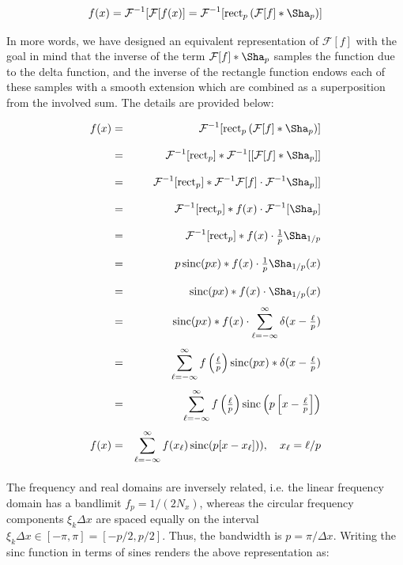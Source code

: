 \documentclass[11pt,titlepage]{report}
\begin{document}
$$f(x) = \mathcal{F}^{-1}[\mathcal{F}[f(x)] = \mathcal{F}^{-1}[\text{rect}_p\,(\mathcal{F}[f] * \Sha_p)]$$

\noindent In more words, we have designed an equivalent representation of $\mathcal{F}[f]$ with the goal in mind that the inverse of the term $\mathcal{F}[f] * \Sha_p$ samples the function due to the delta function, and the inverse of the rectangle function endows each of these samples with a smooth extension which are combined as a superposition from the involved sum. The details are provided below:

\begin{eqnarray*}
  f(x) & = & \mathcal{F}^{-1}[\text{rect}_p\,(\mathcal{F}[f] * \Sha_p)] \\[0.8em]
& = & \mathcal{F}^{-1}[\text{rect}_p] * \mathcal{F}^{-1}[[\mathcal{F}[f]*\Sha_p]] \\[0.8em]
& = & \mathcal{F}^{-1}[\text{rect}_p] * \mathcal{F}^{-1}\mathcal{F}[f]\cdot \mathcal{F}^{-1}\Sha_p]] \\[0.8em]
& = & \mathcal{F}^{-1}[\text{rect}_p] * f(x)\cdot \mathcal{F}^{-1}[\Sha_p] \\[0.8em]
& = & \mathcal{F}^{-1}[\text{rect}_p] * f(x)\cdot \tfrac{1}{p}\Sha_{1/p} \\[0.8em]
& = & p \,\text{sinc}(px) * f(x)\cdot \tfrac{1}{p}\Sha_{1/p}(x)  \\[0.8em]
& = & \text{sinc}(px) * f(x)\cdot \Sha_{1/p}(x)  \\[0.3em]
& = & \text{sinc}(px) * f(x)\cdot \sum_{\ell = -\infty}^{\infty} \delta (x - \tfrac{\ell}{p}) \\[0.3em]
& = & \sum_{\ell = -\infty}^{\infty} f\left(\tfrac{\ell}{p}\right)\text{sinc}(px) * \delta (x - \tfrac{\ell}{p}) \\[0.3em]
& = & \sum_{\ell = -\infty}^{\infty} f\left(\tfrac{\ell}{p}\right)\text{sinc}\left(p\left[x - \tfrac{\ell}{p}\right]\right)\\[0.3em]
f(x) & = & \sum_{\ell = -\infty}^{\infty} f(x_{\ell})\,\text{sinc}(p[x - x_{\ell}])), \quad x_{\ell} = \ell / p\\[0.3em]
\end{eqnarray*}

The frequency and real domains are inversely related, i.e. the linear frequency domain has a bandlimit $f_p = 1 / (2N_x)$, whereas the circular frequency components $\xi_k\Delta x$ are spaced equally on the interval $\xi_k\Delta x \in [-\pi , \pi] = [-p /2, p/ 2]$. Thus, the bandwidth is $p = \pi / \Delta x$. Writing the sinc function in terms of sines renders the above representation as:
\end{document}
